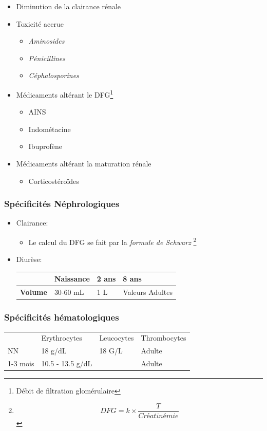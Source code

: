 \documentclass[11pt]{article}
\begin{document}
\begin{enumerate}
\begin{itemize}
\begin{itemize}
\item Diminution de la clairance rénale
\item Toxicité accrue
\begin{itemize}
\item \emph{Aminosides}
\item \emph{Pénicillines}
\item \emph{Céphalosporines}
\end{itemize}
\item Médicaments altérant le DFG\footnote{Débit de filtration glomérulaire}
\begin{itemize}
\item AINS
\item Indométacine
\item Ibuprofène
\end{itemize}
\item Médicaments altérant la maturation rénale
\begin{itemize}
\item Corticostéroïdes
\end{itemize}
\end{itemize}
\end{itemize}
\end{enumerate}
\subsubsection{Spécificités Néphrologiques}
\label{sec:orgf4ba982}
\begin{itemize}
\item Clairance:
\begin{itemize}
\item Le calcul du DFG se fait par la \emph{formule de Schwarz}
\footnote{\[DFG = k \times \frac{T}{Créatinémie}\]}
\end{itemize}

\item Diurèse:
\begin{center}
\begin{tabular}{llll}
 & Naissance & 2 ans & 8 ans\\
\hline
\textbf{Volume} & 30-60 mL & 1 L & Valeurs Adultes\\
\end{tabular}
\end{center}
\end{itemize}
\subsubsection{Spécificités hématologiques}
\label{sec:org4aa6faa}
\begin{center}
\begin{tabular}{llll}
 & Erythrocytes & Leucocytes & Thrombocytes\\
NN & 18 g/dL & 18 G/L & Adulte\\
1-3 mois & 10.5 - 13.5 g/dL &  & Adulte\\
\end{tabular}
\end{center}
\end{document}
